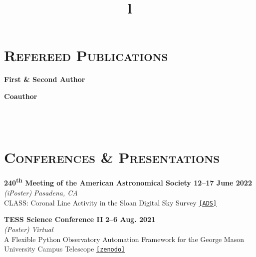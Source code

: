 \documentclass[marg, centered]{res}
\begin{document}
\begin{resume}
\section{{\scshape \bfseries Refereed Publications}}

\vspace{-0.1cm}
\textbf{First \& Second Author}
\vspace{0.05cm}

\textbf{Coauthor}
\vspace{0.05cm}
\vspace{0.05cm}


\begin{format}
\title{l} \\
 \\
\body
\end{format}

\section{{\scshape \bfseries Conferences \& Presentations}}

\begin{etaremune}
    
\item \textbf{240\textsuperscript{th} Meeting of the American Astronomical Society \hfill \textbf{12--17 June 2022}}\\
\textit{(iPoster)} \hfill \textit{Pasadena, CA}\\
CLASS: Coronal Line Activity in the Sloan Digital Sky Survey \href{https://ui.adsabs.harvard.edu/abs/2022AAS...24010113R/abstract}{\texttt{[ADS]}}

\item \textbf{TESS Science Conference II} \hfill \textbf{2--6 Aug. 2021}\\
\textit{(Poster)} \hfill \textit{Virtual}\\
A Flexible Python Observatory Automation Framework for the George Mason\\ University Campus Telescope \href{https://zenodo.org/record/5115310}{\texttt{[zenodo]}}\\


\end{etaremune}
\end{resume}
\end{document}
